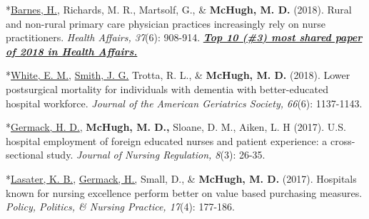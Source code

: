 \documentclass[10pt,]{article}
\begin{document}
{{{{{{{{{{{{{{{\begin{hangparas}{.25in}{1}
\end{hangparas}

\vspace{4mm}

\vspace{4mm}

\begin{hangparas}{.25in}{1}

*{\underline {Barnes, H.}}, Richards, M. R., Martsolf, G., \& {\textbf {McHugh, M. D.}} (2018). Rural and non-rural primary care physician practices increasingly rely on nurse practitioners. {\textit {Health Affairs, 37}}(6): 908-914. {\textit {\textbf {\underline {Top 10 (\#3) most shared paper of 2018 in Health Affairs.}}}}

\end{hangparas}

\vspace{4mm}

\begin{hangparas}{.25in}{1}

*{\underline {White, E. M.}}, {\underline {Smith, J. G.}} Trotta, R. L., \& {\textbf {McHugh, M. D.}} (2018). Lower postsurgical mortality for individuals with dementia with better-educated hospital workforce. {\textit {Journal of the American Geriatrics Society, 66}}(6): 1137-1143.

\end{hangparas}

\vspace{4mm}

\begin{hangparas}{.25in}{1}

*{\underline {Germack, H. D.}}, {\textbf {McHugh, M. D.,}} Sloane, D. M., Aiken, L. H (2017). U.S. hospital employment of foreign educated nurses and patient experience: a cross-sectional study. {\textit {Journal of Nursing Regulation, 8}}(3): 26-35.

\end{hangparas}

\vspace{4mm}

\begin{hangparas}{.25in}{1}

*{\underline {Lasater, K. B.}}, {\underline {Germack, H.,}} Small, D., \& {\textbf {McHugh, M. D.}} (2017). Hospitals known for nursing excellence perform better on value based purchasing measures. {\textit {Policy, Politics, \& Nursing Practice, 17}}(4): 177-186.

\end{hangparas}

}}}}}}}}}}}}}}}
\end{document}
